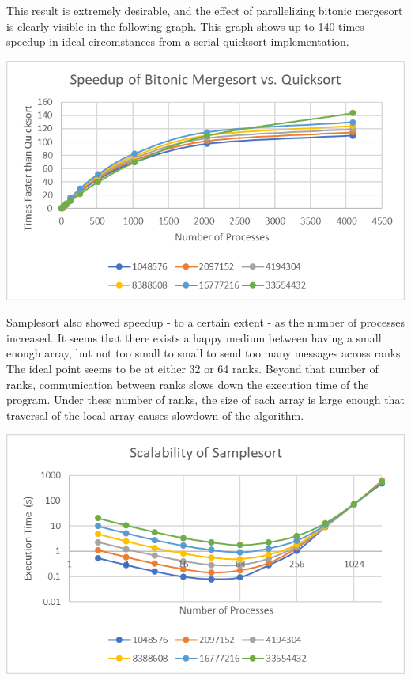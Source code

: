 \documentclass[10pt,letterpaper]{article}
\begin{document}
\begin{multicols}{2}
This result is extremely desirable, and the effect of parallelizing bitonic mergesort is clearly visible in the following graph. This graph shows up to 140 times speedup in ideal circomstances from a serial quicksort implementation.

\begin{center}
\includegraphics[scale=1.3]{bitonic_speedup}
\end{center}

Samplesort also showed speedup - to a certain extent - as the number of processes increased. It seems that there exists a happy medium between having a small enough array, but not too small to small to send too many messages across ranks. The ideal point seems to be at either 32 or 64 ranks. Beyond that number of ranks, communication between ranks slows down the execution time of the program. Under these number of ranks, the size of each array is large enough that traversal of the local array causes slowdown of the algorithm.

\begin{center}
\includegraphics[scale=1.3]{sample_scale}
\end{center}


\end{multicols}
\end{document}
